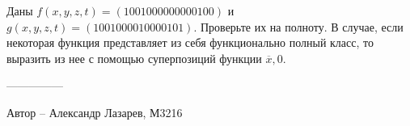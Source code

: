 \question
Даны $f(x, y, z, t) = (1001000000000100)$ и $g(x, y, z, t) = (1001000010000101)$. Проверьте их на полноту. В случае, если некоторая функция представляет из себя функционально полный класс, то выразить из нее с помощью суперпозиций функции $\overline{x}, 0$.

---------------

Автор -- Александр Лазарев, М3216